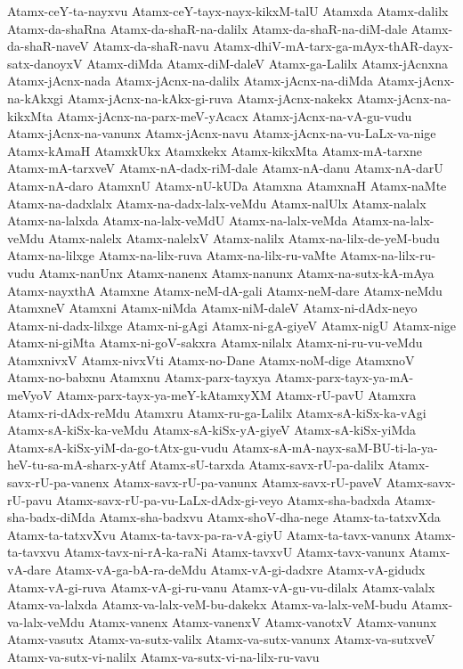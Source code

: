 {Atamx-ceY-ta-nayxvu
Atamx-ceY-tayx-nayx-kikxM-talU
Atamxda
Atamx-dalilx
Atamx-da-shaRna
Atamx-da-shaR-na-dalilx
Atamx-da-shaR-na-diM-dale
Atamx-da-shaR-naveV
Atamx-da-shaR-navu
Atamx-dhiV-mA-tarx-ga-mAyx-thAR-dayx-satx-danoyxV
Atamx-diMda
Atamx-diM-daleV
Atamx-ga-Lalilx
Atamx-jAcnxna
Atamx-jAcnx-nada
Atamx-jAcnx-na-dalilx
Atamx-jAcnx-na-diMda
Atamx-jAcnx-na-kAkxgi
Atamx-jAcnx-na-kAkx-gi-ruva
Atamx-jAcnx-nakekx
Atamx-jAcnx-na-kikxMta
Atamx-jAcnx-na-parx-meV-yAcacx
Atamx-jAcnx-na-vA-gu-vudu
Atamx-jAcnx-na-vanunx
Atamx-jAcnx-navu
Atamx-jAcnx-na-vu-LaLx-va-nige
Atamx-kAmaH
AtamxkUkx
Atamxkekx
Atamx-kikxMta
Atamx-mA-tarxne
Atamx-mA-tarxveV
Atamx-nA-dadx-riM-dale
Atamx-nA-danu
Atamx-nA-darU
Atamx-nA-daro
AtamxnU
Atamx-nU-kUDa
Atamxna
AtamxnaH
Atamx-naMte
Atamx-na-dadxlalx
Atamx-na-dadx-lalx-veMdu
Atamx-nalUlx
Atamx-nalalx
Atamx-na-lalxda
Atamx-na-lalx-veMdU
Atamx-na-lalx-veMda
Atamx-na-lalx-veMdu
Atamx-nalelx
Atamx-nalelxV
Atamx-nalilx
Atamx-na-lilx-de-yeM-budu
Atamx-na-lilxge
Atamx-na-lilx-ruva
Atamx-na-lilx-ru-vaMte
Atamx-na-lilx-ru-vudu
Atamx-nanUnx
Atamx-nanenx
Atamx-nanunx
Atamx-na-sutx-kA-mAya
Atamx-nayxthA
Atamxne
Atamx-neM-dA-gali
Atamx-neM-dare
Atamx-neMdu
AtamxneV
Atamxni
Atamx-niMda
Atamx-niM-daleV
Atamx-ni-dAdx-neyo
Atamx-ni-dadx-lilxge
Atamx-ni-gAgi
Atamx-ni-gA-giyeV
Atamx-nigU
Atamx-nige
Atamx-ni-giMta
Atamx-ni-goV-sakxra
Atamx-nilalx
Atamx-ni-ru-vu-veMdu
AtamxnivxV
Atamx-nivxVti
Atamx-no-Dane
Atamx-noM-dige
AtamxnoV
Atamx-no-babxnu
Atamxnu
Atamx-parx-tayxya
Atamx-parx-tayx-ya-mA-meVyoV
Atamx-parx-tayx-ya-meY-kAtamxyXM
Atamx-rU-pavU
Atamxra
Atamx-ri-dAdx-reMdu
Atamxru
Atamx-ru-ga-Lalilx
Atamx-sA-kiSx-ka-vAgi
Atamx-sA-kiSx-ka-veMdu
Atamx-sA-kiSx-yA-giyeV
Atamx-sA-kiSx-yiMda
Atamx-sA-kiSx-yiM-da-go-tAtx-gu-vudu
Atamx-sA-mA-nayx-saM-BU-ti-la-ya-heV-tu-sa-mA-sharx-yAtf
Atamx-sU-tarxda
Atamx-savx-rU-pa-dalilx
Atamx-savx-rU-pa-vanenx
Atamx-savx-rU-pa-vanunx
Atamx-savx-rU-paveV
Atamx-savx-rU-pavu
Atamx-savx-rU-pa-vu-LaLx-dAdx-gi-veyo
Atamx-sha-badxda
Atamx-sha-badx-diMda
Atamx-sha-badxvu
Atamx-shoV-dha-nege
Atamx-ta-tatxvXda
Atamx-ta-tatxvXvu
Atamx-ta-tavx-pa-ra-vA-giyU
Atamx-ta-tavx-vanunx
Atamx-ta-tavxvu
Atamx-tavx-ni-rA-ka-raNi
Atamx-tavxvU
Atamx-tavx-vanunx
Atamx-vA-dare
Atamx-vA-ga-bA-ra-deMdu
Atamx-vA-gi-dadxre
Atamx-vA-gidudx
Atamx-vA-gi-ruva
Atamx-vA-gi-ru-vanu
Atamx-vA-gu-vu-dilalx
Atamx-valalx
Atamx-va-lalxda
Atamx-va-lalx-veM-bu-dakekx
Atamx-va-lalx-veM-budu
Atamx-va-lalx-veMdu
Atamx-vanenx
Atamx-vanenxV
Atamx-vanotxV
Atamx-vanunx
Atamx-vasutx
Atamx-va-sutx-valilx
Atamx-va-sutx-vanunx
Atamx-va-sutxveV
Atamx-va-sutx-vi-nalilx
Atamx-va-sutx-vi-na-lilx-ru-vavu
}
